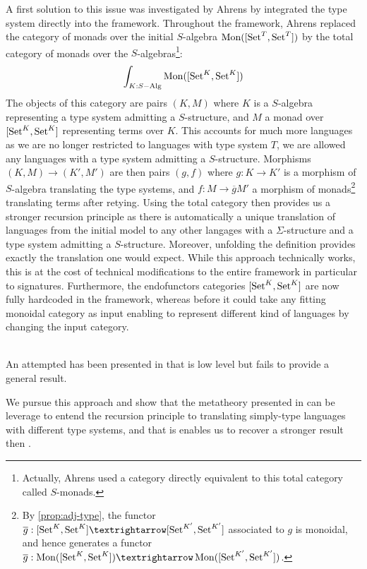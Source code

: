 A first solution to this issue was investigated by Ahrens \cite{ExtendedInitiality12}
by integrated the type system directly into the framework.
Throughout the framework, Ahrens replaced the category of monads over the
initial $S$-algebra $\operatorname{Mon}([\operatorname{Set}^{T},\operatorname{Set}^{T}])$ by the total category of
monads over the $S$-algebras\footnote{
  Actually, Ahrens used a category directly equivalent to this total
  category called $S$-monads.}:
%
\[\int_{K : S-\mathrm{Alg}} \operatorname{Mon}([\operatorname{Set}^K,\operatorname{Set}^K]) \]
%
The objects of this category are pairs $(K,M)$ where $K$ is a $S$-algebra
representing a type system admitting a $S$-structure, and $M$ a monad over
$[\operatorname{Set}^{K},\operatorname{Set}^{K}]$ representing terms over $K$.
This accounts for much more languages as we are no longer restricted to
languages with type system $T$, we are allowed any languages with a type
system admitting a $S$-structure.
Morphisms $(K,M) → (K',M')$ are then pairs $(g,f)$ where $g : K → K'$ is
a morphism of $S$-algebra translating the type systems, and $f : M → \overline{g}M'$
a morphism of monads\footnote{
  By \cref{prop:adj-type}, the functor $\overline{g} : [\Set^K,\Set^K] → [\Set^{K'},\Set^{K'}]$
  associated to $g$ is monoidal, and hence generates a functor
  $\overline{g} : \Mon([\Set^K,\Set^K]) → \Mon([\Set^{K'},\Set^{K'}])$.
}
translating terms after retying.
Using the total category then provides us a stronger recursion principle as
there is automatically a unique translation of languages from the initial model
to any other langages with a $\Sigma$-structure and a type system admitting a $S$-structure.
Moreover, unfolding the definition provides exactly the translation one would expect.
While this approach technically works, this is at the cost of technical modifications
to the entire framework in particular to signatures.
Furthermore, the endofunctors categories $[\operatorname{Set}^K,\operatorname{Set}^K]$ are now fully hardcoded
in the framework, whereas before it could take any fitting monoidal category as input
enabling to represent different kind of languages by changing the input category.

 \\
An attempted has been presented in \cite{IntroductionIS24} that is low level
but fails to provide a general result.

We pursue this approach and show that the metatheory presented in
 can be leverage to entend the recursion principle to
translating simply-type languages with different type systems, and that is
enables us to recover a stronger result then \cite{ExtendedInitiality12}.

